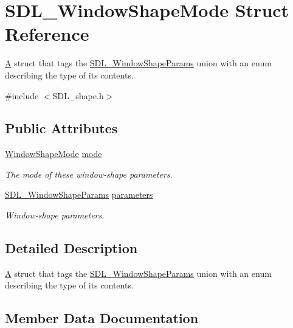 \hypertarget{struct_s_d_l___window_shape_mode}{}\section{S\+D\+L\+\_\+\+Window\+Shape\+Mode Struct Reference}
\label{struct_s_d_l___window_shape_mode}


\mbox{\hyperlink{struct_a}{A}} struct that tags the \mbox{\hyperlink{union_s_d_l___window_shape_params}{S\+D\+L\+\_\+\+Window\+Shape\+Params}} union with an enum describing the type of its contents.  




{\ttfamily \#include $<$S\+D\+L\+\_\+shape.\+h$>$}

\subsection*{Public Attributes}
\begin{DoxyCompactItemize}
\item 
\mbox{\hyperlink{_s_d_l__shape_8h_aa30948f2699e316a43b740eccebe5c20}{Window\+Shape\+Mode}} \mbox{\hyperlink{struct_s_d_l___window_shape_mode_a40ebd8b9a76d982cbd87563386cc05de}{mode}}
\begin{DoxyCompactList}\small\item\em The mode of these window-\/shape parameters. \end{DoxyCompactList}\item 
\mbox{\hyperlink{union_s_d_l___window_shape_params}{S\+D\+L\+\_\+\+Window\+Shape\+Params}} \mbox{\hyperlink{struct_s_d_l___window_shape_mode_a2f79bb294034156207fa6d88d3a8c819}{parameters}}
\begin{DoxyCompactList}\small\item\em Window-\/shape parameters. \end{DoxyCompactList}\end{DoxyCompactItemize}


\subsection{Detailed Description}
\mbox{\hyperlink{struct_a}{A}} struct that tags the \mbox{\hyperlink{union_s_d_l___window_shape_params}{S\+D\+L\+\_\+\+Window\+Shape\+Params}} union with an enum describing the type of its contents. 

\subsection{Member Data Documentation}
\mbox{\label{struct_s_d_l___window_shape_mode_a40ebd8b9a76d982cbd87563386cc05de}} 
